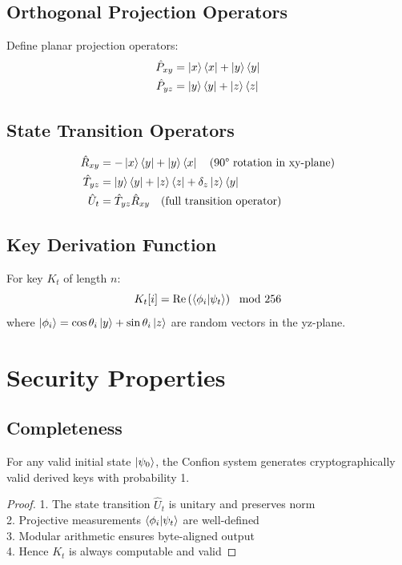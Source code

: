 \documentclass[12pt]{article}
\begin{document}
\subsection{Orthogonal Projection Operators}
Define planar projection operators:
\begin{align*}
\hat{P}_{xy} &= \ket{x}\bra{x} + \ket{y}\bra{y} \\
\hat{P}_{yz} &= \ket{y}\bra{y} + \ket{z}\bra{z}
\end{align*}

\subsection{State Transition Operators}
\begin{align*}
\hat{R}_{xy} &= -\ket{x}\bra{y} + \ket{y}\bra{x} \quad \text{(90° rotation in xy-plane)} \\
\hat{T}_{yz} &= \ket{y}\bra{y} + \ket{z}\bra{z} + \delta_z\ket{z}\bra{y} \\
\hat{U}_t &= \hat{T}_{yz}\hat{R}_{xy} \quad \text{(full transition operator)}
\end{align*}

\subsection{Key Derivation Function}
For key $K_t$ of length $n$:
\[
K_t[i] = \operatorname{Re}\left( \braket{\phi_i | \psi_t} \right) \mod 256
\]
where $\ket{\phi_i} = \cos\theta_i\ket{y} + \sin\theta_i\ket{z}$ are random vectors in the yz-plane.

\section{Security Properties}

\subsection{Completeness}

\begin{theorem}
For any valid initial state $\ket{\psi_0}$, the Confion system generates cryptographically valid derived keys with probability 1.
\end{theorem}

\begin{proof}
1. The state transition $\hat{U}_t$ is unitary and preserves norm \\
2. Projective measurements $\braket{\phi_i|\psi_t}$ are well-defined \\
3. Modular arithmetic ensures byte-aligned output \\
4. Hence $K_t$ is always computable and valid
\end{proof}
\end{document}
